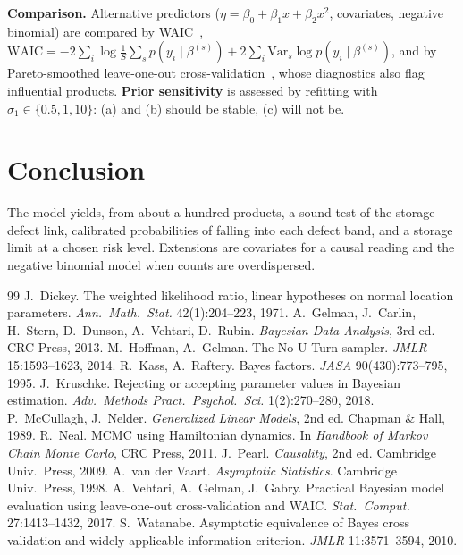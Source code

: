 \documentclass[10pt,twocolumn]{article}
\begin{document}
\textbf{Comparison.} Alternative predictors ($\eta=\beta_0+\beta_1x+\beta_2x^2$, covariates, negative binomial) are compared by WAIC~\cite{watanabe2010},
$\mathrm{WAIC}=-2\sum_i\log\frac1S\sum_sp(y_i\mid\beta^{(s)})+2\sum_i\mathrm{Var}_s\log p(y_i\mid\beta^{(s)})$,
and by Pareto-smoothed leave-one-out cross-validation~\cite{vehtari2017}, whose diagnostics also flag influential products. \textbf{Prior sensitivity} is assessed by refitting with $\sigma_1\in\{0.5,1,10\}$: (a) and (b) should be stable, (c) will not be.

\section{Conclusion}
The model yields, from about a hundred products, a sound test of the storage--defect link, calibrated probabilities of falling into each defect band, and a storage limit at a chosen risk level. Extensions are covariates for a causal reading and the negative binomial model when counts are overdispersed.

\footnotesize
\begin{thebibliography}{99}\setlength{\itemsep}{0pt}
 J.~Dickey. The weighted likelihood ratio, linear hypotheses on normal location parameters. \emph{Ann.\ Math.\ Stat.} 42(1):204--223, 1971.
 A.~Gelman, J.~Carlin, H.~Stern, D.~Dunson, A.~Vehtari, D.~Rubin. \emph{Bayesian Data Analysis}, 3rd ed. CRC Press, 2013.
 M.~Hoffman, A.~Gelman. The No-U-Turn sampler. \emph{JMLR} 15:1593--1623, 2014.
 R.~Kass, A.~Raftery. Bayes factors. \emph{JASA} 90(430):773--795, 1995.
 J.~Kruschke. Rejecting or accepting parameter values in Bayesian estimation. \emph{Adv.\ Methods Pract.\ Psychol.\ Sci.} 1(2):270--280, 2018.
 P.~McCullagh, J.~Nelder. \emph{Generalized Linear Models}, 2nd ed. Chapman \& Hall, 1989.
 R.~Neal. MCMC using Hamiltonian dynamics. In \emph{Handbook of Markov Chain Monte Carlo}, CRC Press, 2011.
 J.~Pearl. \emph{Causality}, 2nd ed. Cambridge Univ.\ Press, 2009.
 A.~van der Vaart. \emph{Asymptotic Statistics}. Cambridge Univ.\ Press, 1998.
 A.~Vehtari, A.~Gelman, J.~Gabry. Practical Bayesian model evaluation using leave-one-out cross-validation and WAIC. \emph{Stat.\ Comput.} 27:1413--1432, 2017.
 S.~Watanabe. Asymptotic equivalence of Bayes cross validation and widely applicable information criterion. \emph{JMLR} 11:3571--3594, 2010.
\end{thebibliography}
\end{document}
